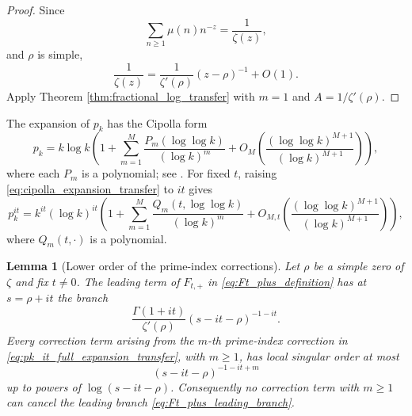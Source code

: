 \documentclass[11pt]{amsart}
\numberwithin{equation}{section}
\theoremstyle{plain}
\newtheorem{lemma}[theorem]{Lemma}
\theoremstyle{definition}
\theoremstyle{remark}
\begin{document}
\begin{proof}
Since
\begin{equation}
\sum_{n\ge1}\mu(n)n^{-z}=\frac1{\zeta(z)},
\label{eq:reciprocal_zeta_recalled_transfer}
\end{equation}
and $\rho$ is simple,
\begin{equation}
\frac1{\zeta(z)}=
\frac1{\zeta'(\rho)}(z-\rho)^{-1}+O(1).
\label{eq:reciprocal_zeta_simple_zero_transfer}
\end{equation}
Apply Theorem \ref{thm:fractional_log_transfer} with $m=1$ and
$A=1/\zeta'(\rho)$.
\end{proof}

The expansion of $p_k$ has the Cipolla form
\begin{equation}
p_k=k\log k\left(1+\sum_{m=1}^{M}\frac{P_m(\log\log k)}{(\log k)^m}
+O_M\left(\frac{(\log\log k)^{M+1}}{(\log k)^{M+1}}\right)\right),
\label{eq:cipolla_expansion_transfer}
\end{equation}
where each $P_m$ is a polynomial; see \cite{Cipolla1902,AriasToulisse2013}.
For fixed $t$, raising \eqref{eq:cipolla_expansion_transfer} to $it$
gives
\begin{equation}
p_k^{it}=k^{it}(\log k)^{it}
\left(1+\sum_{m=1}^{M}\frac{Q_m(t,\log\log k)}{(\log k)^m}
+O_{M,t}\left(\frac{(\log\log k)^{M+1}}{(\log k)^{M+1}}\right)\right),
\label{eq:pk_it_full_expansion_transfer}
\end{equation}
where $Q_m(t,\cdot)$ is a polynomial.

\begin{lemma}[Lower order of the prime-index corrections]
\label{lem:lower_order_prime_corrections}
Let $\rho$ be a simple zero of $\zeta$ and fix $t\ne0$.  The leading
term of $F_{t,+}$ in \eqref{eq:Ft_plus_definition} has at
$s=\rho+it$ the branch
\begin{equation}
\frac{\Gamma(1+it)}{\zeta'(\rho)}(s-it-\rho)^{-1-it}.
\label{eq:Ft_plus_leading_branch}
\end{equation}
Every correction term arising from the $m$-th prime-index correction in
\eqref{eq:pk_it_full_expansion_transfer}, with $m\ge1$, has local
singular order at most
\begin{equation}
(s-it-\rho)^{-1-it+m}
\label{eq:lower_correction_order}
\end{equation}
up to powers of $\log(s-it-\rho)$.
Consequently no correction term with $m\ge1$ can cancel the leading
branch \eqref{eq:Ft_plus_leading_branch}.
\end{lemma}
\end{document}
